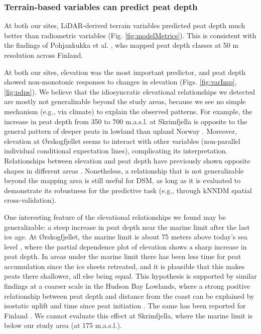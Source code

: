 \documentclass[soil, manuscript]{copernicus}
\begin{document}
\subsubsection{Terrain-based variables can predict peat depth}

At both our sites, LiDAR-derived terrain variables predicted peat depth much better than radiometric variables (Fig. \ref{fig:modelMetrics}).
This is consistent with the findings of Pohjankukka et al. \citeyearpar{pohjankukkaDigitalMappingPeat2025}, who mapped peat depth classes at 50 m resolution across Finland.

At both our sites, elevation was the most important predictor, and peat depth showed non-monotonic responses to changes in elevation (Figs. \ref{fig:varImp}, \ref{fig:pdps}).
We believe that the idiosyncratic elevational relationships we detected are mostly not generalizable beyond the study areas, because we see no simple mechanism (e.g., via climate) to explain the observed patterns.
For example, the increase in peat depth from 350 to 700 m.a.s.l. at Skrimfjella is opposite to the general pattern of deeper peats in lowland than upland Norway \citep{lyngstadBeskrivelserAvTorvmassivenheter2023}.
Moreover, elevation at Ørskogfjellet seems to interact with other variables (non-parallel individual conditional expectation lines), complicating its interpretation.
Relationships between elevation and peat depth have previously shown opposite shapes in different areas \citep{finlaysonEstimatingOrganicSurface2021}.
Nonetheless, a relationship that is not generalizable beyond the mapping area is still useful for DSM, as long as it is evaluated to demonstrate its robustness for the predictive task (e.g., through kNNDM spatial cross-validation).

One interesting feature of the elevational relationships we found may be generalizable: a steep increase in peat depth near the marine limit after the last ice age.
At Ørskogfjellet, the marine limit is about 75 meters above today's sea level \citep[Geological Survey of Norway,][]{hogaasDatabaseRegistreringAv2012}, where the partial dependence plot of elevation shows a sharp increase in peat depth.
In areas under the marine limit there has been less time for peat accumulation since the ice sheets retreated, and it is plausible that this makes peats there shallower, all else being equal.
This hypothesis is supported by similar findings at a coarser scale in the Hudson Bay Lowlands, where a strong positive relationship between peat depth and distance from the coast can be explained by isostatic uplift and time since peat initiation \citep{liPeatDepthCarbon2025}.
The same has been reported for Finland \citep{pohjankukkaDigitalMappingPeat2025}.
We cannot evaluate this effect at Skrimfjella, where the marine limit is below our study area (at 175 m.a.s.l.).
\end{document}
